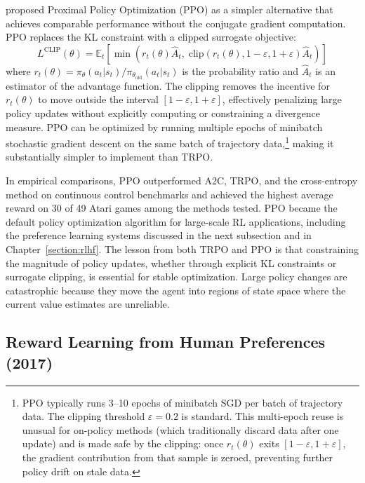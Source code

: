 \citet{Schulman2017} proposed Proximal Policy Optimization (PPO) as a simpler alternative that achieves comparable performance without the conjugate gradient computation. PPO replaces the KL constraint with a clipped surrogate objective:
\begin{equation}
L^{\text{CLIP}}(\theta) = \mathbb{E}_t \left[ \min\!\left( r_t(\theta) \hat{A}_t, \; \text{clip}(r_t(\theta), 1-\varepsilon, 1+\varepsilon) \hat{A}_t \right) \right]
\end{equation}
where $r_t(\theta) = \pi_\theta(a_t|s_t) / \pi_{\theta_{\text{old}}}(a_t|s_t)$ is the probability ratio and $\hat{A}_t$ is an estimator of the advantage function. The clipping removes the incentive for $r_t(\theta)$ to move outside the interval $[1-\varepsilon, 1+\varepsilon]$, effectively penalizing large policy updates without explicitly computing or constraining a divergence measure. PPO can be optimized by running multiple epochs of minibatch stochastic gradient descent on the same batch of trajectory data,\footnote{PPO typically runs 3--10 epochs of minibatch SGD per batch of trajectory data. The clipping threshold $\varepsilon = 0.2$ is standard. This multi-epoch reuse is unusual for on-policy methods (which traditionally discard data after one update) and is made safe by the clipping: once $r_t(\theta)$ exits $[1-\varepsilon, 1+\varepsilon]$, the gradient contribution from that sample is zeroed, preventing further policy drift on stale data.} making it substantially simpler to implement than TRPO.

In empirical comparisons, PPO outperformed A2C, TRPO, and the cross-entropy method on continuous control benchmarks and achieved the highest average reward on 30 of 49 Atari games among the methods tested. PPO became the default policy optimization algorithm for large-scale RL applications, including the preference learning systems discussed in the next subsection and in Chapter~\ref{section:rlhf}. The lesson from both TRPO and PPO is that constraining the magnitude of policy updates, whether through explicit KL constraints or surrogate clipping, is essential for stable optimization. Large policy changes are catastrophic because they move the agent into regions of state space where the current value estimates are unreliable.

\subsection{Reward Learning from Human Preferences (2017)}

